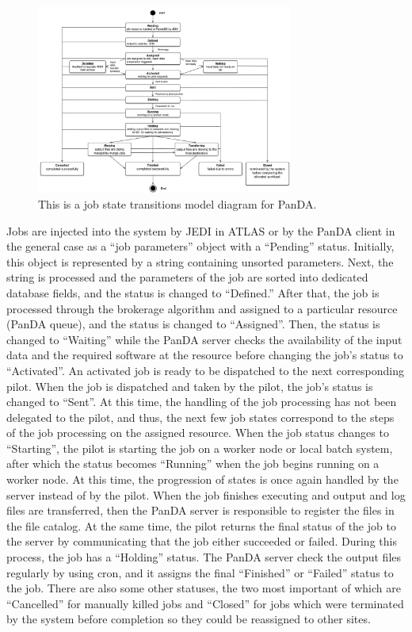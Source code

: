 \begin{figure}
  \includegraphics[width=0.75\textwidth]{images/job-state-diagram.png}
\caption{This is a job state transitions model diagram for PanDA.}
\label{fig:jobstates}
\end{figure}

Jobs are injected into the system by JEDI in ATLAS or by the PanDA client in
the general case as a ``job parameters'' object with a ``Pending'' status.
Initially, this object is represented by a string containing unsorted
parameters. Next, the string is processed and the parameters of the job are
sorted into dedicated database fields, and the status is changed to
``Defined.'' After that, the job is processed through the brokerage algorithm
and assigned to a particular resource (PanDA queue), and the status is changed
to ``Assigned''. Then, the status is changed to ``Waiting'' while the PanDA
server checks the availability of the input data and the required software at
the resource before changing the job's status to ``Activated''. An activated
job is ready to be dispatched to the next corresponding pilot. When the job is
dispatched and taken by the pilot, the job's status is changed to ``Sent''. At
this time, the handling of the job processing has not been delegated to the
pilot, and thus, the next few job states correspond to the steps of the job
processing on the assigned resource. When the job status changes to
``Starting'', the pilot is starting the job on a worker node or local batch
system, after which the status becomes ``Running'' when the job begins running
on a worker node. At this time, the progression of states is once again handled
by the server instead of by the pilot. When the job finishes executing and
output and log files are transferred, then the PanDA server is responsible to
register the files in the file catalog. At the same time, the pilot returns the
final status of the job to the server by communicating that the job either
succeeded or failed. During this process, the job has a ``Holding'' status. The
PanDA server check the output files regularly by using cron, and it assigns the
final ``Finished'' or ``Failed'' status to the job. There are also some other
statuses, the two most important of which are ``Cancelled'' for manually killed
jobs and ``Closed'' for jobs which were terminated by the system before
completion so they could be reassigned to other sites.

